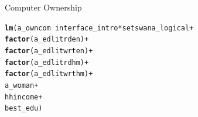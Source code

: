 \documentclass[a4paper,british]{article}\usepackage[]{graphicx}\usepackage[]{color}
\makeatletter
\newcommand{\hlopt}[1]{\textcolor[rgb]{0,0,0}{#1}}%
\newcommand{\hlstd}[1]{\textcolor[rgb]{0.345,0.345,0.345}{#1}}%
\newcommand{\hlkwd}[1]{\textcolor[rgb]{0.737,0.353,0.396}{\textbf{#1}}}%
\newenvironment{kframe}{%
 \def\at@end@of@kframe{}%
 \ifinner\ifhmode%
  \def\at@end@of@kframe{\end{minipage}}%
  \begin{minipage}{\columnwidth}%
 \fi\fi%
 \def\FrameCommand##1{\hskip\@totalleftmargin \hskip-\fboxsep
 \colorbox{shadecolor}{##1}\hskip-\fboxsep
     \hskip-\linewidth \hskip-\@totalleftmargin \hskip\columnwidth}%
 \MakeFramed {\advance\hsize-\width
   \@totalleftmargin\z@ \linewidth\hsize
   \@setminipage}}%
 {\par\unskip\endMakeFramed%
 \at@end@of@kframe}
\newenvironment{knitrout}{}{} %
\makeatother
\begin{document}
\begin{table}[H]
\caption{Computer Ownership}
\label{tab:owncom}

\begin{knitrout}
\color{fgcolor}\begin{kframe}
\begin{alltt}
\hlkwd{lm}\hlstd{(a_owncom} \hlopt{~} \hlstd{interface_intro}\hlopt{*}\hlstd{setswana_logical} \hlopt{+}
              \hlkwd{factor}\hlstd{(a_edlitrden)}                       \hlopt{+}
              \hlkwd{factor}\hlstd{(a_edlitwrten)}                      \hlopt{+}
              \hlkwd{factor}\hlstd{(a_edlitrdhm)}                       \hlopt{+}
              \hlkwd{factor}\hlstd{(a_edlitwrthm)}                      \hlopt{+}
              \hlstd{a_woman}                                   \hlopt{+}
              \hlstd{hhincome}                                  \hlopt{+}
              \hlstd{best_edu)}
\end{alltt}
\end{kframe}



\end{knitrout}
\end{table}
\end{document}
